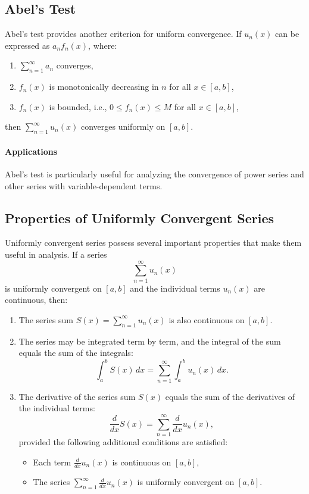 \documentclass[12pt]{article}
\begin{document}
\subsection{Abel's Test}
Abel's test provides another criterion for uniform convergence. If \(u_n(x)\) can be expressed as \(a_n f_n(x)\), where:
\begin{enumerate}
    \item \(\sum_{n=1}^\infty a_n\) converges,
    \item \(f_n(x)\) is monotonically decreasing in \(n\) for all \(x \in [a, b]\),
    \item \(f_n(x)\) is bounded, i.e., \(0 \leq f_n(x) \leq M\) for all \(x \in [a, b]\),
\end{enumerate}
then \(\sum_{n=1}^\infty u_n(x)\) converges uniformly on \([a, b]\).

\paragraph{Applications}
Abel's test is particularly useful for analyzing the convergence of power series and other series with variable-dependent terms.

\subsection{Properties of Uniformly Convergent Series}
Uniformly convergent series possess several important properties that make them useful in analysis. If a series 
\[
\sum_{n=1}^\infty u_n(x)
\]
is uniformly convergent on \([a, b]\) and the individual terms \(u_n(x)\) are continuous, then:

\begin{enumerate}
    \item The series sum \(S(x) = \sum_{n=1}^\infty u_n(x)\) is also continuous on \([a, b]\).
    \item The series may be integrated term by term, and the integral of the sum equals the sum of the integrals:
    \[
    \int_a^b S(x) \, dx = \sum_{n=1}^\infty \int_a^b u_n(x) \, dx.
    \]
    \item The derivative of the series sum \(S(x)\) equals the sum of the derivatives of the individual terms:
    \[
    \frac{d}{dx} S(x) = \sum_{n=1}^\infty \frac{d}{dx} u_n(x),
    \]
    provided the following additional conditions are satisfied:
    \begin{itemize}
        \item Each term \(\frac{d}{dx} u_n(x)\) is continuous on \([a, b]\),
        \item The series \(\sum_{n=1}^\infty \frac{d}{dx} u_n(x)\) is uniformly convergent on \([a, b]\).
    \end{itemize}
\end{enumerate}
\end{document}
